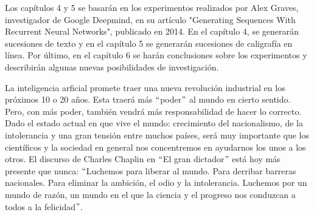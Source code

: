 \vspace{1em}

Los capítulos 4 y 5 se basarán en los experimentos realizados por Alex Graves, investigador de Google Deepmind, en su artículo "Generating Sequences With Recurrent Neural Networks", publicado en 2014. En el capítulo 4, se generarán sucesiones de texto y en el capítulo 5 se generarán sucesiones de caligrafía en línea. Por último, en el capítulo 6 se harán conclusiones sobre los experimentos y describirán algunas nuevas posibilidades de investigación. \cite{DBLP:journals/corr/Graves13}

\vspace{1em}

La inteligencia arficial promete traer una nueva revolución industrial en los próximos 10 o 20 años. Esta traerá más $``$poder$"$ al mundo en cierto sentido. Pero, con más poder, también vendrá más responsabilidad de hacer lo correcto. Dado el estado actual en que vive el mundo: crecimiento del nacionalismo, de la intolerancia y una gran tensión entre muchos países, será muy importante que los científicos y la sociedad en general nos concentremos en ayudarnos los unos a los otros. El discurso de Charles Chaplin en $``$El gran dictador$"$ está hoy más presente que nunca: $``$Luchemos para liberar al mundo. Para derribar barreras nacionales. Para eliminar la ambición, el odio y la intolerancia. Luchemos por un mundo de razón, un mundo en el que la ciencia y el progreso nos conduzcan a todos a la felicidad$"$.
\cite{goodfellow-et-al-2016}







